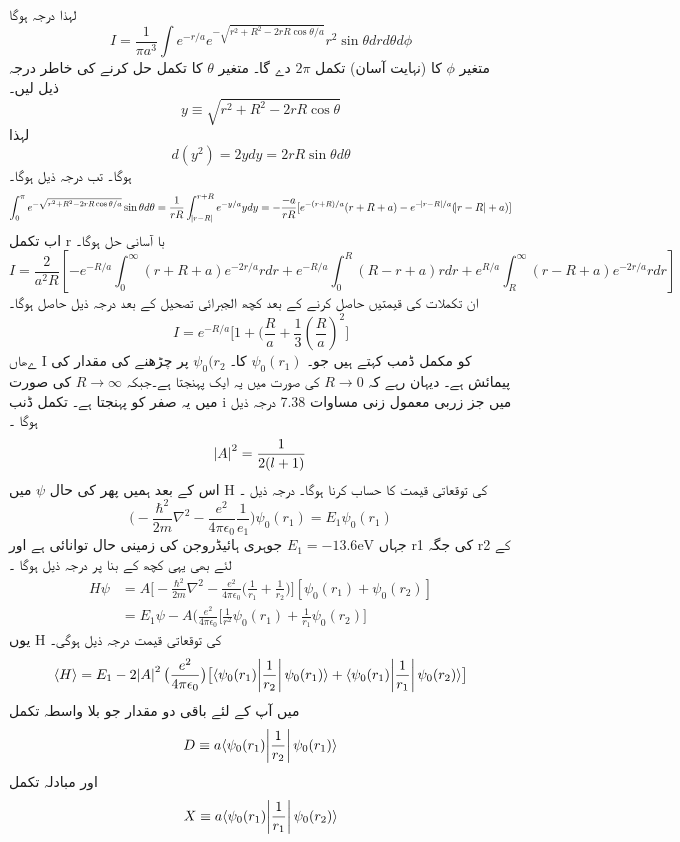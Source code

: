%
لہذا درجہ ہوگا \\
\[I=\frac{1}{\pi a^{3}}\int e^{-r/a}e^{-\sqrt{r^{2}+R^{2}-2rR\cos{\theta/a}}}r^{2}\sin{\theta}drd\theta d\phi\]
متغیر 
\(\phi\)
 کا (نہایت آسان) تکمل 
 \(2\pi\)
 دے گا۔ متغیر 
 \(\theta\)
  کا تکمل حل کرنے کی خاطر درجہ ذیل لیں۔\\
\[y\equiv\sqrt{r^{2}+R^{2}-2rR\cos{\theta}}\]
لہذا 
\[d(y^{2})=2ydy=2rR\sin{\theta}d\theta\]
ہوگا۔ تب درجہ ذیل ہوگا۔
\[\int_{0}^{\pi}e^{-\sqrt{r^{2}+R^{2}-2rR\cos{\theta/a}}}\sin{\theta}d\theta=\frac{1}{rR}\int_{\abs{r-R}}^{r+R}e^{-y/a}ydy=-\frac{-a}{rR}[e^{-(r+R)/a}(r+R+a)-e^{-\abs{r-R}/a}(\abs{r-R}+a)]\]
اب تکمل r با آسانی حل ہوگا۔ 
\[I=\frac{2}{a^{2}R}[-e^{-R/a}\int_{0}^{\infty}(r+R+a)e^{-2r/a}rdr+e^{-R/a}\int_{0}^{R}(R-r+a)rdr+e^{R/a}\int_{R}^{\infty}(r-R+a)e^{-2r/a}rdr]\]
ان تکملات کی قیمتیں حاصل کرنے کے بعد کچھ الجبرائی تصحیل کے بعد درجہ ذیل حاصل ہوگا۔
\[I=e^{-R/a}\big[1+(\frac{R}{a}+\frac{1}{3}(\frac{R}{a})^{2}\big]\]
ےھاں  ٰI کو مکمل ڈمب کہتے ہیں جو۔
\(\psi_{0}(r_{1})\)
 کا۔
 \(\psi_{0}(r_{2}\)
 پر چڑھنے کی مقدار کی پیمائش ہے۔ دیہان رہے کہ 
 \(R\rightarrow 0\)
 کی صورت میں یہ ایک پہنجتا ہے۔جبکہ 
 \(R\rightarrow \infty\)
  کی صورت میں یہ صفر کو پہنجتا ہے۔ تکمل ڈنب i میں جز زربی معمول زنی مساوات 7.38 درجہ ذیل ہوگا ۔\\
\[\abs{A}^{2}=\frac{1}{2(l+1)}\]
اس کے بعد ہمیں پھر کی حال 
\(\psi\)
 میں H کی توقعاتی قیمت کا حساب کرنا ہوگا۔ درجہ ذیل ۔
 \[\big(-\frac{\hbar^{2}}{2m}\nabla^{2}-\frac{e^{2}}{4\pi\epsilon_{0}}\frac{1}{e_{1}}\big)\psi_{0}(r_{1})=E_{1}\psi_{0}(r_{1})\]
 جہاں 
 \(E_{1}=-13.6\text{eV}\)
 جوہری ہائیڈروجن کی زمینی حال توانائی ہے اور r1 کی جگہ r2 کے لئے بھی یہی کچھ کے بنا پر درجہ ذیل ہوگا ۔
\begin{align*}
H\psi&=A\big[-\frac{\hbar^{2}}{2m}\nabla^{2}-\frac{e^{2}}{4\pi\epsilon_{0}}\big(\frac{1}{r_{1}}+\frac{1}{r_{2}}\big)\big][\psi_{0}(r_{1})+\psi_{0}(r_{2})]\\
&=E_{1}\psi-A(\frac{e^{2}}{4\pi\epsilon_{0}}\big[\frac{1}{r^{2}}\psi_{0}(r_{1})+\frac{1}{r_{1}}\psi_{0}(r_{2})\big]
\end{align*}
یوں H کی توقعاتی قیمت درجہ ذیل ہوگی۔
\[\langle H \rangle =E_{1}-2\abs{A}^{2}\big(\frac{e^{2}}{4\pi\epsilon_{0}}\big)\big[\langle \psi_{0}(r_{1})\abs{\frac{1}{r_{2}}}\psi_{0}(r_{1})\rangle +\langle \psi_{0}(r_{1})\abs{\frac{1}{r_{1}}}\psi_{0}(r_{2})\rangle\big]\]
میں آپ کے لئے باقی دو مقدار جو بلا واسطہ تکمل 
\[D\equiv a\langle \psi_{0}(r_{1})\abs{\frac{1}{r_{2}}}\psi_{0}(r_{1})\rangle\]
اور
مبادلہ تکمل 
\[X\equiv a\langle\psi_{0}(r_{1})\abs{\frac{1}{r_{1}}}\psi_{0}(r_{2})\rangle\]
